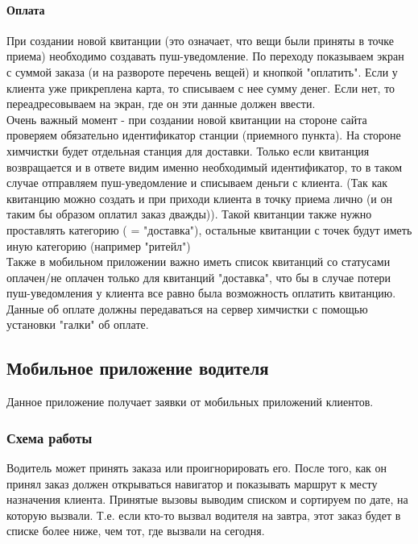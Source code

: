 \documentclass[DIV=calc, paper=a4, fontsize=11pt]{scrartcl} %
\begin{document}
\paragraph{Оплата}
При создании новой квитанции (это означает, что вещи были приняты в точке приема) необходимо создавать пуш-уведомление. По переходу показываем экран с суммой заказа (и на развороте перечень вещей) и кнопкой "оплатить". Если у клиента уже прикреплена карта, то списываем с нее сумму денег. Если нет, то переадресовываем на экран, где он эти данные должен ввести.
\\[0.5cm]
Очень важный момент - при создании новой квитанции на стороне сайта проверяем обязательно идентификатор станции (приемного пункта). На стороне химчистки будет отдельная станция для доставки. Только если квитанция возвращается и в ответе видим именно необходимый идентификатор, то в таком случае отправляем пуш-уведомление и списываем деньги с клиента. (Так как квитанцию можно создать и при приходи клиента в точку приема лично (и он таким бы образом оплатил заказ дважды)). Такой квитанции также нужно проставлять категорию ( = "доставка"), остальные квитанции с точек будут иметь иную категорию (например "ритейл")
\\[0.5cm]
Также в мобильном приложении важно иметь список квитанций со статусами оплачен/не оплачен только для квитанций "доставка", что бы в случае потери пуш-уведомления у клиента все равно была возможность оплатить квитанцию.
\\[0.5cm]
Данные об оплате должны передаваться на сервер химчистки с помощью установки "галки" об оплате.

\subsection{Мобильное приложение водителя}
Данное приложение получает заявки от мобильных приложений клиентов. 

\subsubsection{Схема работы}
Водитель может принять заказа или проигнорировать его. После того, как он принял заказ должен открываться навигатор и показывать маршрут к месту назначения клиента. Принятые вызовы выводим списком и сортируем по дате, на которую вызвали. Т.е. если кто-то вызвал водителя на завтра, этот заказ будет в списке более ниже, чем тот, где вызвали на сегодня.
\end{document}
